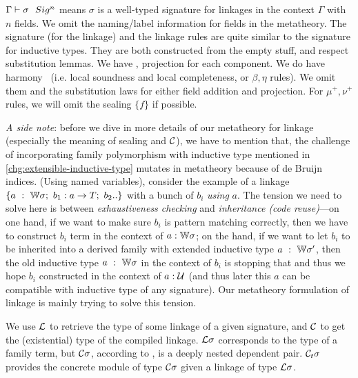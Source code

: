 ${ {\Gamma} \vdash {\sigma} \ \ Sig^{n} }$ means $\sigma$ is a well-typed signature
for linkages in the context $\Gamma$ with $n$ fields. We omit the
naming/label information for fields in the meta\-theory. The signature (for the linkage) and the linkage rules are quite similar to
the signature for inductive types.  They are both constructed from the
empty stuff, and respect substitution lemmas. We have
,  projection for each component.
We do have harmony~\cite{pfenning2009lecture} (i.e. local soundness
and local completeness, or $\beta,\eta$ rules). We omit them and the
substitution laws for either field addition and projection. For
$\mu^+,\nu^+$ rules, we will omit the sealing $\{f\}$ if possible.

\textit{A side note}: before we dive in more details of our metatheory
for linkage (especially the meaning of sealing and ${\mathcal{C}}$), we have to
mention that, the challenge of incorporating family polymorphism with
inductive type mentioned in \ref{chg:extensible-inductive-type} mutates
in metatheory because of de Bruijn indices. (Using named variables),
consider the example of a linkage $\{a~:~{\mathbb{W}} \sigma;\ b_1 : a \to T;\
b_2 ..\}$ with a bunch of $b_i$ \textit{using} $a$. The tension we need
to solve here is between \textit{exhaustiveness checking} and
\textit{inheritance (code reuse)}---on one hand, if we want to make sure
$b_i$ is pattern matching correctly, then we have to construct $b_i$
term in the context of $a : {\mathbb{W}}\sigma$; on the hand, if we want to let
$b_i$ to be inherited into a derived family with extended inductive type
$a~:~{\mathbb{W}} \sigma'$, then the old inductive type $a~:~{\mathbb{W}} \sigma$ in the
context of $b_i$ is stopping that and thus we hope $b_i$ constructed in
the context of $a : {\mathcal{U}}$ (and thus later this $a$ can be compatible with
inductive type of any signature). Our metatheory formulation of linkage
is mainly trying to solve this tension.



We use ${\mathcal{L}}$ to retrieve the type of some linkage of a given signature,
and ${\mathcal{C}}$ to get the (existential) type of the compiled linkage.
${\mathcal{L}}\sigma$ corresponds to the type of a family term, but ${\mathcal{C}}\sigma$,
according to \ruleref{Compile}, is a deeply nested dependent pair.
${\mathcal{C}_t} \sigma$ provides the concrete module of type ${\mathcal{C}}\sigma$ given a
linkage of type ${\mathcal{L}}\sigma$. 

